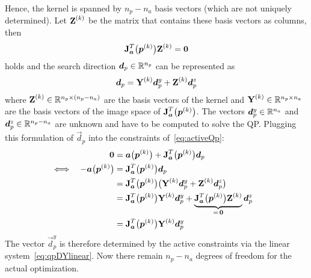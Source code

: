 				Hence, the kernel is spanned by \( n_p - n_a \) basis vectors (which are not uniquely determined). Let \( \bm{\mathrm{Z}}^{(k)} \) be the matrix that contains these basis vectors as columns, then
				\begin{align*}
					\bm{\mathrm{J}}_{\bm{a}}^T\big(\bm{p}^{(k)}\big) \bm{\mathrm{Z}}^{(k)} = \bm{\mathrm{0}}
				\end{align*}
				holds and the search direction \( \bm{d}_p \in \mathbb{R}^{n_p} \) can be represented as
				\begin{align*}
					\bm{d}_p = \bm{\mathrm{Y}}^{(k)} \bm{d}_p^y + \bm{\mathrm{Z}}^{(k)} \bm{d}_p^z
				\end{align*}
				where \( \bm{\mathrm{Z}}^{(k)} \in \mathbb{R}^{n_p \times (n_p - n_a)} \) are the basis vectors of the kernel and \( \bm{\mathrm{Y}}^{(k)} \in \mathbb{R}^{n_p \times n_a} \) are the basis vectors of the image space of \( \bm{\mathrm{J}}_{\bm{a}}^T\big(\bm{p}^{(k)}\big) \). The vectors \( \bm{d}_p^y \in \mathbb{R}^{n_a} \) and \( \bm{d}_p^z \in \mathbb{R}^{n_p - n_a} \) are unknown and have to be computed to solve the QP. Plugging this formulation of \( \vec{d}_p \) into the constraints of~\eqref{eq:activeQp}:
				\begin{align}
					     &  & \bm{0}                         & = \bm{a}\big(\bm{p}^{(k)}\big) + \bm{\mathrm{J}}_{\bm{a}}^T\big(\bm{p}^{(k)}\big) \bm{d}_p                                                                                  & \nonumber             \\
					\iff &  & -\bm{a}\big(\bm{p}^{(k)}\big) & = \bm{\mathrm{J}}_{\bm{a}}^T\big(\bm{p}^{(k)}\big) \bm{d}_p                                                                                                                   & \nonumber             \\
					     &  &                                 & = \bm{\mathrm{J}}_{\bm{a}}^T\big(\bm{p}^{(k)}\big) \big( \bm{\mathrm{Y}}^{(k)} \bm{d}_p^y + \bm{\mathrm{Z}}^{(k)} \bm{d}_p^z \big)                                                           & \nonumber             \\
					     &  &                                 & = \bm{\mathrm{J}}_{\bm{a}}^T\big(\bm{p}^{(k)}\big) \bm{\mathrm{Y}}^{(k)} \bm{d}_p^y + \underbrace{\bm{\mathrm{J}}_{\bm{a}}^T\big(\bm{p}^{(k)}\big) \bm{\mathrm{Z}}^{(k)}}_{=\, \bm{\mathrm{0}}} \bm{d}_p^z & \nonumber             \\
					     &  &                                 & = \bm{\mathrm{J}}_{\bm{a}}^T\big(\bm{p}^{(k)}\big) \bm{\mathrm{Y}}^{(k)} \bm{d}_p^y                                                                                                   & \label{eq:qpDYlinear}
				\end{align}
				The vector \( \vec{d}_p^y \) is therefore determined by the active constraints via the linear system~\eqref{eq:qpDYlinear}. Now there remain \( n_p - n_a \) degrees of freedom for the actual optimization.

